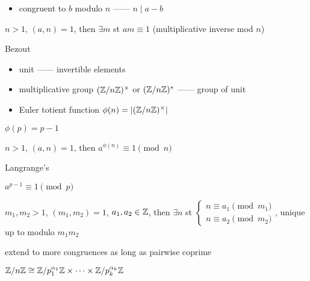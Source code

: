 \begin{itemize}
    \item congruent to $b$ modulo $n$ ------ $n \mid a - b$
\end{itemize}

\begin{lemma}
    $n  >1$, $(a, n) = 1$, then $\exists m$ st $am \equiv 1$ (multiplicative inverse mod $n$)
\end{lemma}
\begin{pf}
    Bezout
\end{pf}

\begin{itemize}
    \item unit ------ invertible elements
    \item multiplicative group $(\mathbb{Z}/n\mathbb{Z})^\times$ or $(\mathbb{Z}/n\mathbb{Z})^*$ ------ group of unit
    \item Euler totient function $\phi(n) = \left|(\mathbb{Z}/n\mathbb{Z})^\times  \right|$
\end{itemize}

\begin{fact}
    $\phi(p) = p - 1$
\end{fact}

\begin{thm}
    $n > 1$, $(a , n ) = 1$, then $a^{\phi(n)} \equiv 1 \pmod n$
\end{thm}
\begin{pf}
    Langrange's
\end{pf}

\begin{cor}
    $a^{p-1} \equiv 1 \pmod{p}$
\end{cor}

\begin{thm}
    $m_1, m_2 > 1$, $(m_1, m_2) = 1$, $a_1, a_2 \in \mathbb{Z}$, then $\exists n$ st
    $\begin{cases}
         n \equiv a_1 \pmod{m_1}\\
         n \equiv a_2 \pmod{m_2}
    \end{cases}$, unique up to modulo $m_{1}m_2$
\end{thm}

\begin{fact}
    extend to more congruences as long as pairwise coprime
\end{fact}

\begin{fact}
    $\mathbb{Z}/n\mathbb{Z} \cong \mathbb{Z}/p_1^{\alpha_1}\mathbb{Z} \times \cdots \times \mathbb{Z}/p_k^{\alpha_k}\mathbb{Z}$
\end{fact}

